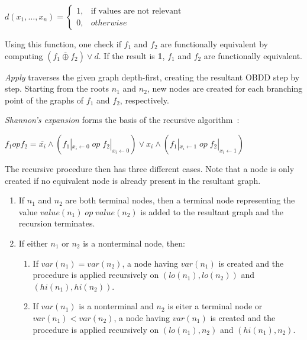 \documentclass{vldb}
\begin{document}
$d(x_1, \ldots, x_n)=
\begin{cases}
    1, & \text{if values are not relevant} \\
    0, & otherwise
\end{cases}
$

\noindent
Using this function, one check if $f_1$ and $f_2$ are functionally equivalent by
computing $(f_1\overline{\oplus}f_2)\lor d$. If the result is \textbf{1}, $f_1$
and $f_2$ are functionally equivalent.

\textit{Apply} traverses the given graph depth-first, creating the resultant OBDD
step by step. Starting from the roots $n_1$ and $n_2$, new nodes are created for
each branching point of the graphs of $f_1$ and $f_2$, respectively.

\textit{Shannon's expansion} forms the basis of the recursive
algorithm~\cite{BRYANT86}:
\begin{center}
$
f_1 op f_2 =
\overline{x_i} \land \left(f_1|_{x_i\leftarrow 0}\;op\;f_2|_{x_i\leftarrow 0}\right)
\lor x_i \land \left(f_1|_{x_i\leftarrow 1}\;op\;f_2|_{x_i\leftarrow 1}\right)
$
\end{center}

\noindent
The recursive procedure then has three different cases. Note that a node is only
created if no equivalent node is already present in the resultant graph.
\begin{enumerate}
    \item{
        If $n_1$ and $n_2$ are both terminal nodes, then a terminal node
        representing the value $value(n_1)\;op\;value(n_2)$ is added to the
        resultant graph and the recursion terminates.
    }
    \item{
        If either $n_1$ or $n_2$ is a nonterminal node, then:
        \begin{enumerate}
            \item{
                If $var(n_1) = var(n_2)$, a node having $var(n_1)$ is created and
                the procedure is applied recursively on $(lo(n_1), lo(n_2))$ and
                $(hi(n_1), hi(n_2))$.
            }
            \item{
                If $var(n_1)$ is a nonterminal and $n_2$ is eiter a terminal node
                or $var(n_1) < var(n_2)$, a node having $var(n_1)$ is created and
                the procedure is applied recursively on $(lo(n_1), n_2)$ and
                $(hi(n_1), n_2)$.
            }
        \end{enumerate}
    }
\end{enumerate}
\end{document}
